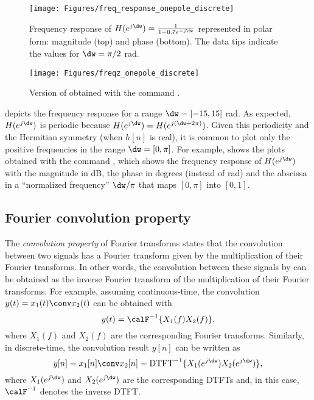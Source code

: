 \begin{figure}
\centering
\texttt{[image: Figures/freq\_response\_onepole\_discrete]}
\caption[{Frequency response represented in polar form: magnitude (top) and phase (bottom).}]{Frequency response of $H(e^{j\dw}) = \frac{1}{1 - 0.7e^{-j\dw}}$ represented in polar form: magnitude (top) and phase (bottom). The data tips indicate the values for $\dw=\pi/2$ rad.\label{fig:freq_response_onepole_discrete}}
\end{figure}

\begin{figure}
\centering
\texttt{[image: Figures/freqz\_onepole\_discrete]}
\caption{Version of  obtained with the command .\label{fig:freqz_onepole_discrete}}
\end{figure}

 depicts the frequency response for a range $\dw=[-15,15]$ rad. As expected, $H(e^{j\dw})$ is periodic because $H(e^{j\dw}) = H(e^{j(\dw+ 2\pi)})$. Given this periodicity and the Hermitian symmetry (when $h[n]$ is real), it is common to plot only the positive frequencies in the range $\dw=[0, \pi]$. For example,  shows the plots obtained with the command , which shows the frequency response of $H(e^{j\dw})$ with the magnitude in dB, the phase in degrees (instead of rad) and the abscissa in a ``normalized frequency'' $\dw/\pi$ that maps $[0, \pi]$ into $[0, 1]$.
\eExample 


\subsection{Fourier convolution property}
\label{sec:FourierConvolutionProperty}

The \emph{convolution property} of Fourier transforms states that the convolution between two signals has a Fourier transform given by the multiplication of their Fourier transforms. In other words, the convolution between these signals by can be obtained as the inverse Fourier transform of the multiplication of their Fourier transforms. For example, assuming continuous-time, the convolution $y(t)=x_1(t) \conv x_2(t)$ can be obtained with
\begin{equation}
y(t) = \calF^{-1} \{ X_1(f) X_2(f) \},
\label{eq:convolutionInFreqDomain}
\end{equation}
where $X_1(f)$  and $X_2(f)$ are the corresponding Fourier transforms.
Similarly, in discrete-time, the convolution result $y[n]$ can be written as
\begin{equation}
y[n] = x_1[n] \conv x_2[n] = \textrm{DTFT}^{-1} \{ X_1(e^{j \dw}) X_2(e^{j \dw}) \},
\label{eq:convolutionInFreqDomainDiscreteTime}
\end{equation}
where $X_1(e^{j \dw})$ and $X_2(e^{j \dw})$ are the corresponding DTFTs and, in this case, $\calF^{-1}$ denotes the inverse DTFT.

